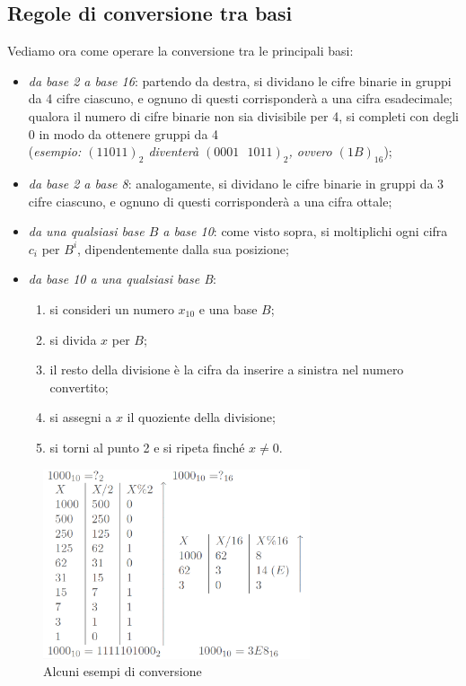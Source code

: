 \documentclass[class=book, crop=false]{standalone}
\begin{document}
\subsection{Regole di conversione tra basi}
Vediamo ora come operare la conversione tra le principali basi:
\begin{itemize}[noitemsep,nolistsep]
	\item \emph{da base 2 a base 16}: partendo da destra, si dividano le cifre binarie in gruppi da 4 cifre ciascuno, e ognuno di questi corrisponderà a una cifra esadecimale; qualora il numero di cifre binarie non sia divisibile per 4, si completi con degli 0 in modo da ottenere gruppi da 4\\ (\emph{esempio: $(11011)_{2}$ diventerà $(0001\text{ }1011)_{2}$, ovvero $(1B)_{16}$});
	\item \emph{da base 2 a base 8}: analogamente, si dividano le cifre binarie in gruppi da 3 cifre ciascuno, e ognuno di questi corrisponderà a una cifra ottale;
	\item \emph{da una qualsiasi base $B$ a base 10}: come visto sopra, si moltiplichi ogni cifra $c_{i}$ per $B^{i}$, dipendentemente dalla sua posizione;
	\item \emph{da base 10 a una qualsiasi base B}:
	\begin{enumerate}
		\item si consideri un numero $x_{10}$ e una base $B$;
		\item si divida $x$ per $B$;
		\item il resto della divisione è la cifra da inserire a sinistra nel numero convertito;
		\item si assegni a $x$ il quoziente della divisione;
		\item si torni al punto 2 e si ripeta finché $x\neq0$.
	\end{enumerate}
\end{itemize}
\begin{figure}[H]
	\centering
	\includegraphics[width=0.7\textwidth,keepaspectratio]{esempi_conversioni.png}
	\caption{Alcuni esempi di conversione}
\end{figure}
\end{document}
